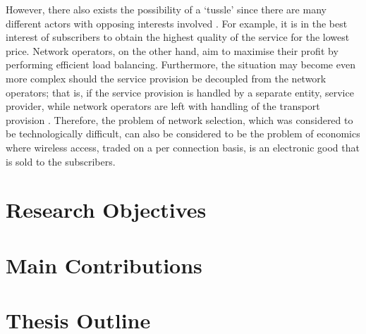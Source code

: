 However, there also exists the possibility of a `tussle' since there are many different actors with opposing interests involved \cite{Clark02}. For example, it is in the best interest of subscribers to obtain the highest quality of the service for the lowest price. Network operators, on the other hand, aim to maximise their profit by performing efficient load balancing. Furthermore, the situation may become even more complex should the service provision be decoupled from the network operators; that is, if the service provision is handled by a separate entity, service provider, while network operators are left with handling of the transport provision \cite{DMBushTussle09}. Therefore, the problem of network selection, which was considered to be technologically difficult, can also be considered to be the problem of economics where wireless access, traded on a per connection basis, is an electronic good that is sold to the subscribers.

\section{Research Objectives} %
\label{sec:research_objectives_introduction}


\section{Main Contributions} %
\label{sec:main_contributions_introduction}


\section{Thesis Outline} %
\label{sec:thesis_outline_introduction}


